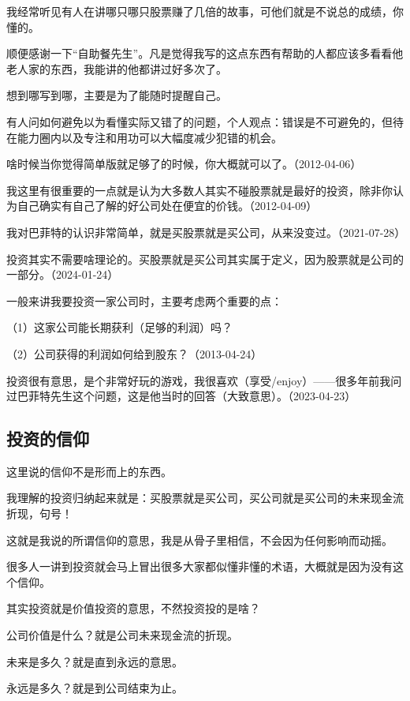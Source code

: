我经常听见有人在讲哪只哪只股票赚了几倍的故事，可他们就是不说总的成绩，你懂的。

顺便感谢一下“自助餐先生”。凡是觉得我写的这点东西有帮助的人都应该多看看他老人家的东西，我能讲的他都讲过好多次了。

想到哪写到哪，主要是为了能随时提醒自己。

有人问如何避免以为看懂实际又错了的问题，个人观点：错误是不可避免的，但待在能力圈内以及专注和用功可以大幅度减少犯错的机会。

啥时候当你觉得简单版就足够了的时候，你大概就可以了。（2012-04-06）

我这里有很重要的一点就是认为大多数人其实不碰股票就是最好的投资，除非你认为自己确实有自己了解的好公司处在便宜的价钱。（2012-04-09）

我对巴菲特的认识非常简单，就是买股票就是买公司，从来没变过。（2021-07-28）

投资其实不需要啥理论的。买股票就是买公司其实属于定义，因为股票就是公司的一部分。（2024-01-24）

一般来讲我要投资一家公司时，主要考虑两个重要的点：

（1）这家公司能长期获利（足够的利润）吗？

（2）公司获得的利润如何给到股东？（2013-04-24）


投资很有意思，是个非常好玩的游戏，我很喜欢（享受/enjoy）——很多年前我问过巴菲特先生这个问题，这是他当时的回答（大致意思）。（2023-04-23）

\subsection{投资的信仰}

这里说的信仰不是形而上的东西。

我理解的投资归纳起来就是：买股票就是买公司，买公司就是买公司的未来现金流折现，句号！

这就是我说的所谓信仰的意思，我是从骨子里相信，不会因为任何影响而动摇。

很多人一讲到投资就会马上冒出很多大家都似懂非懂的术语，大概就是因为没有这个信仰。

其实投资就是价值投资的意思，不然投资投的是啥？

公司价值是什么？就是公司未来现金流的折现。

未来是多久？就是直到永远的意思。

永远是多久？就是到公司结束为止。

